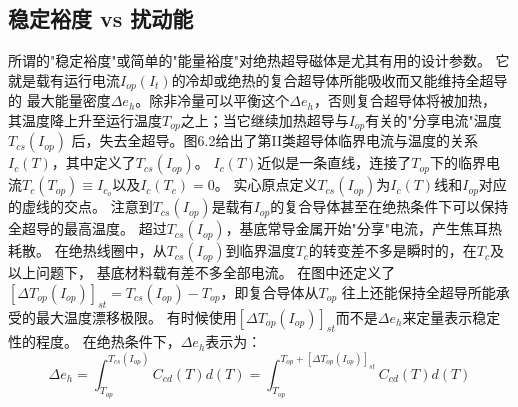 \subsection{稳定裕度 vs 扰动能}
所谓的"稳定裕度"或简单的"能量裕度"对绝热超导磁体是尤其有用的设计参数。
它就是载有运行电流$I_{op}(I_t)$的冷却或绝热的复合超导体所能吸收而又能维持全超导的
最大能量密度$\Delta e_h$。除非冷量可以平衡这个$\Delta e_h$，否则复合超导体将被加热，
其温度降上升至运行温度$T_{op}$之上；当它继续加热超导与$I_{op}$有关的"分享电流"温度$T_{cs}(I_{op})$
后，失去全超导。图6.2给出了第II类超导体临界电流与温度的关系$I_c(T)$，其中定义了$T_{cs}(I_{op})$。
$I_c(T)$近似是一条直线，连接了$T_{op}$下的临界电流$T_c(T_{op})\equiv I_{c_o}$以及$I_c(T_c)=0$。
实心原点定义$T_{cs}(I_{op})$为$I_c(T)$线和$I_{op}$对应的虚线的交点。
注意到$T_{cs}(I_{op})$是载有$I_{op}$的复合导体甚至在绝热条件下可以保持全超导的最高温度。
超过$T_{cs}(I_{op})$，基底常导金属开始"分享"电流，产生焦耳热耗散。
在绝热线圈中，从$T_{cs}(I_{op})$到临界温度$T_c$的转变差不多是瞬时的，在$T_c$及以上问题下，
基底材料载有差不多全部电流。
在图中还定义了$[\Delta T_{op}(I_{op})]_{st}=T_{cs}(I_{op})-T_{op}$，即复合导体从$T_{op}$
往上还能保持全超导所能承受的最大温度漂移极限。
有时候使用$[\Delta T_{op}(I_{op})]_{st}$而不是$\Delta e_h$来定量表示稳定性的程度。
在绝热条件下，$\Delta e_h$表示为： 
\begin{equation}%
\Delta e_h=\int_{T_{op}}^{T_{cs}(I_{op})}{C_{cd}(T)d(T)}=\int_{T_{op}}^{T_{op}+[\Delta T_{op}(I_{op})]_{st}}{C_{cd}(T)d(T)}
\end{equation}

